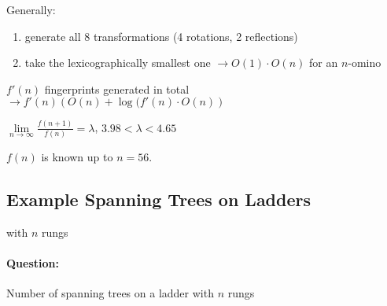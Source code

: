 \documentclass[11pt]{article}
\begin{document}
Generally:
\begin{enumerate}
\item generate all 8 transformations (4 rotations, 2 reflections)
\item take the lexicographically smallest one $ \rightarrow O(1) \cdot O(n) $ for an $ n $-omino
\end{enumerate}

$ f'(n) $ fingerprints generated in total $ \rightarrow f'(n)\left( O(n) + \log (f'(n) \cdot O(n) \right)$ \newline

$ \lim \limits_{n \rightarrow \infty} \frac{f ( n + 1)}{f(n)} = \lambda $, $ 3.98 < \lambda < 4.65 $ \newline

$ f(n) $ is known up to $ n = 56 $.



\subsection{Example Spanning Trees on Ladders}

with $ n $ rungs


\paragraph{Question:} Number of spanning trees on a ladder with $ n $ rungs
\end{document}
